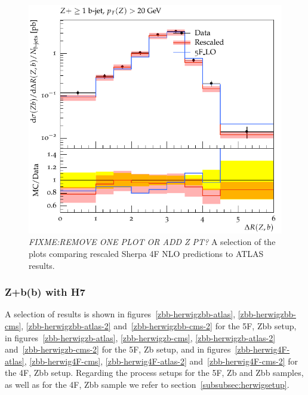 \documentclass[11pt]{cernrep}
\newcommand{\Herwig}{H\protect\scalebox{0.8}{ERWIG}7\xspace}
\begin{document}
\begin{figure}[htbp]
\begin{center}
   \includegraphics[scale=0.65]{figs/zbb/sherpa/d13-x01-y01_rescaled.pdf} 
\caption{{\em FIXME:REMOVE ONE PLOT OR ADD Z PT?} A selection of the plots
  comparing rescaled Sherpa 4F NLO predictions to ATLAS results.}
\label{zbb-sherpa-scaled}
\end{center}
\end{figure}

\subsubsection{Z+b(b) with \Herwig}
\label{sec:ZHerwig}

A selection of results is shown in figures~\ref{zbb-herwigzbb-atlas},
\ref{zbb-herwigzbb-cms}, \ref{zbb-herwigzbb-atlas-2}
and~\ref{zbb-herwigzbb-cms-2} for the 5F, Zbb setup,
in figures~\ref{zbb-herwigzb-atlas}, \ref{zbb-herwigzb-cms},
\ref{zbb-herwigzb-atlas-2} and~\ref{zbb-herwigzb-cms-2} for the 5F, Zb
setup,
and in figures~\ref{zbb-herwig4F-atlas}, \ref{zbb-herwig4F-cms},
\ref{zbb-herwig4F-atlas-2} and~\ref{zbb-herwig4F-cms-2} for the 4F,
Zbb setup.
Regarding the process setups for the 5F, Zb and Zbb samples, as well as for the
4F, Zbb sample we refer to section~\ref{subsubsec:herwigsetup}.
\end{document}
